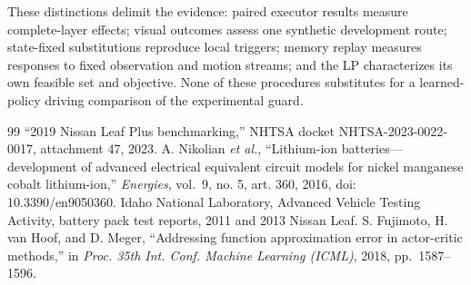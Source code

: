 \documentclass[letterpaper,journal,onecolumn]{IEEEtran}
\begin{document}
These distinctions delimit the evidence: paired executor results measure complete-layer effects; visual outcomes assess one synthetic development route; state-fixed substitutions reproduce local triggers; memory replay measures responses to fixed observation and motion streams; and the LP characterizes its own feasible set and objective. None of these procedures substitutes for a learned-policy driving comparison of the experimental guard.
\begin{thebibliography}{99}
 ``2019 Nissan Leaf Plus benchmarking,'' NHTSA docket NHTSA-2023-0022-0017, attachment 47, 2023.
 A. Nikolian \emph{et al.}, ``Lithium-ion batteries---development of advanced electrical equivalent circuit models for nickel manganese cobalt lithium-ion,'' \emph{Energies}, vol.~9, no. 5, art. 360, 2016, doi: 10.3390/en9050360.
 Idaho National Laboratory, Advanced Vehicle Testing Activity, battery pack test reports, 2011 and 2013 Nissan Leaf.
 S. Fujimoto, H. van Hoof, and D. Meger, ``Addressing function approximation error in actor-critic methods,'' in \emph{Proc. 35th Int. Conf. Machine Learning (ICML)}, 2018, pp.~1587--1596.
\end{thebibliography}
\end{document}
